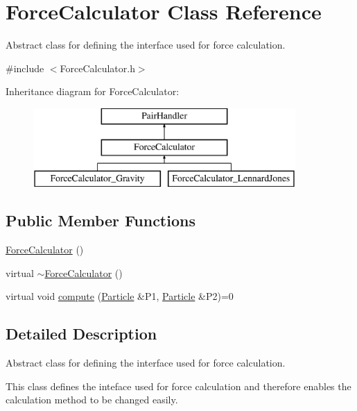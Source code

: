 \hypertarget{classForceCalculator}{\section{Force\-Calculator Class Reference}
\label{classForceCalculator}
}


Abstract class for defining the interface used for force calculation.  




{\ttfamily \#include $<$Force\-Calculator.\-h$>$}

Inheritance diagram for Force\-Calculator\-:\begin{figure}[H]
\begin{center}
\leavevmode
\includegraphics[height=3.000000cm]{classForceCalculator}
\end{center}
\end{figure}
\subsection*{Public Member Functions}
\begin{DoxyCompactItemize}
\item 
\hyperlink{classForceCalculator_ab25fcc538b65e081a4eecd9ed33552f7}{Force\-Calculator} ()
\item 
virtual \hyperlink{classForceCalculator_a4aaafe93cfe95084545ed7c4a7b27533}{$\sim$\-Force\-Calculator} ()
\item 
virtual void \hyperlink{classForceCalculator_a0469e873f4deb9145bc134fabdafe4de}{compute} (\hyperlink{classParticle}{Particle} \&P1, \hyperlink{classParticle}{Particle} \&P2)=0
\end{DoxyCompactItemize}


\subsection{Detailed Description}
Abstract class for defining the interface used for force calculation. 

This class defines the inteface used for force calculation and therefore enables the calculation method to be changed easily. 

